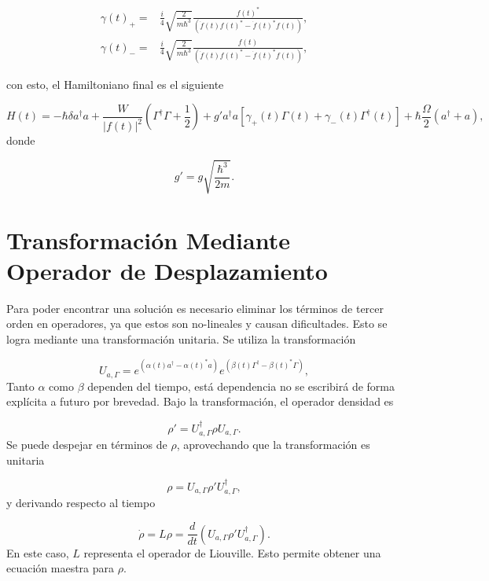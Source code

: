 \documentclass[10pt,a4paper]{report}
\begin{document}
\begin{align}
\gamma(t)_+ =& \frac{i}{4}\sqrt{\frac{2}{m\hbar^3}} \frac{f(t)^*}{(\dot{f}(t)f(t)^*-\dot{f}(t)^*f(t))},\\
\gamma(t)_- =& \frac{i}{4}\sqrt{\frac{2}{m\hbar^3}} \frac{f(t)}{(\dot{f}(t)f(t)^*-\dot{f}(t)^*f(t))},
\end{align}

con esto, el Hamiltoniano final es el siguiente

\begin{equation}\label{LaserCoolingHamiltonian}
H(t) = -\hbar \delta a^\dagger a + \frac{W}{|f(t)|^2}(\Gamma^\dagger \Gamma + \frac{1}{2}) +  g'a^\dagger a[\gamma_+(t)\Gamma (t) +\gamma_-(t)\Gamma^\dagger (t)] + \hbar\frac{\Omega}{2}(a^\dagger + a),
\end{equation} donde 

\begin{equation}
g'=g\sqrt{\frac{\hbar^3}{2m}}.
\end{equation}


\section{Transformación Mediante Operador de Desplazamiento}

Para poder encontrar una solución es necesario eliminar los términos de tercer orden en operadores, ya que estos son no-lineales y causan dificultades. Esto se logra mediante una transformación unitaria. Se utiliza la transformación

\begin{equation}
U_{a,\Gamma} = e^{(\alpha(t) a^\dagger - \alpha(t)^*a)}e^{(\beta(t) \Gamma^\dagger - \beta(t)^*\Gamma)},
\end{equation} Tanto $\alpha$ como $\beta$ dependen del tiempo, está dependencia no se escribirá de forma explícita a futuro por brevedad. Bajo la transformación, el operador densidad es

\begin{equation}
\rho' = U_{a,\Gamma}^\dagger \rho U_{a,\Gamma}.
\end{equation} Se puede despejar en términos de $\rho$, aprovechando que la transformación es unitaria

\begin{equation}
\rho = U_{a,\Gamma} \rho' U_{a,\Gamma}^\dagger,
\end{equation} y derivando respecto al tiempo

\begin{equation}
\dot{\rho} = L\rho = \frac{d}{dt}(U_{a,\Gamma} \rho' U_{a,\Gamma}^\dagger).
\end{equation} En este caso, $L$ representa el operador de Liouville. Esto permite obtener una ecuación maestra para $\rho$. 
\end{document}
